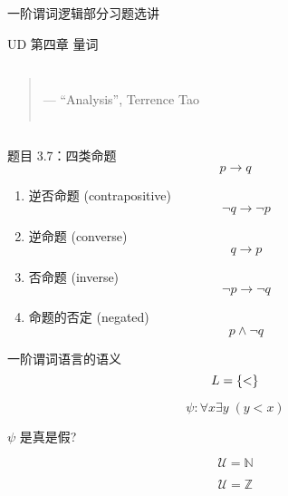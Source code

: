 \begin{frame}{}
  \centerline{\LARGE 一阶谓词逻辑部分习题选讲}
  \vspace{0.50cm}
  \centerline{\large UD 第四章 \; 量词}
\end{frame}

\begin{frame}{}
  \begin{columns}
      \begin{quote}


	\hfill --- ``Analysis'', Terrence Tao
      \end{quote}
  \end{columns}
\end{frame}

\begin{frame}{}
  \begin{exampleblock}{题目 3.7：四类命题}
    \[
      p \to q
    \]
    \begin{enumerate}
      \item 逆否命题 (contrapositive)
	\[
	  \lnot q \to \lnot p
	\]
      \item 逆命题 (converse)
	\[
	  q \to p
	\]
      \item 否命题 (inverse)
	\[
	  \lnot p \to \lnot q
	\]
      \item 命题的否定 (negated)
	\[
	  p \land \lnot q
	\]
    \end{enumerate}
  \end{exampleblock}
\end{frame}

\begin{frame}{一阶谓词语言的语义}
  \[
    L = \{<\}
  \]

  \[
    \psi: \forall x \exists y \; (y < x)
  \]

  \vspace{0.30cm}
  \pause
  \centerline{ $\psi$ 是真是假?}

  \vspace{0.50cm}
  \pause
  \[
    \mathcal{U} = \mathbb{N}
  \]

  \pause
  \[
    \mathcal{U} = \mathbb{Z}
  \]
\end{frame}

